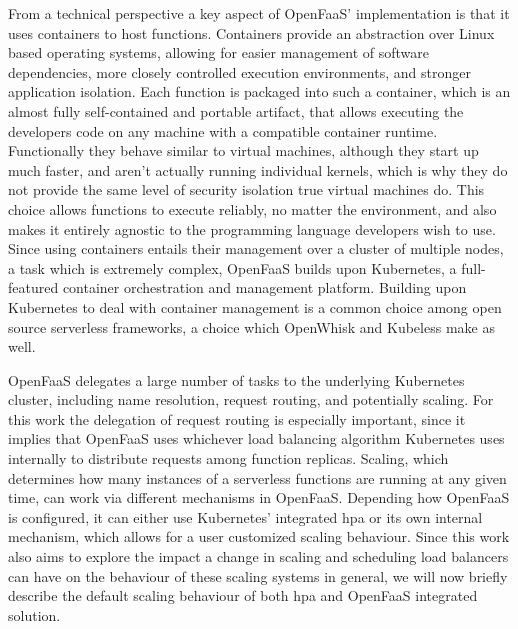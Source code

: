 From a technical perspective a key aspect of OpenFaaS' implementation is that it uses containers to host functions.
Containers provide an abstraction over Linux based operating systems, allowing for easier management of software dependencies, more closely controlled execution environments, and stronger application isolation.
Each function is packaged into such a container, which is an almost fully self-contained and portable artifact, that allows executing the developers code on any machine with a compatible container runtime.
Functionally they behave similar to virtual machines, although they start up much faster, and aren't actually running individual kernels, which is why they do not provide the same level of security isolation true virtual machines do.
This choice allows functions to execute reliably, no matter the environment, and also makes it entirely agnostic to the programming language developers wish to use.
Since using containers entails their management over a cluster of multiple nodes, a task which is extremely complex, OpenFaaS builds upon Kubernetes\cite{kubernetes}, a full-featured container orchestration and management platform.
Building upon Kubernetes to deal with container management is a common choice among open source serverless frameworks, a choice which OpenWhisk and Kubeless make as well\cite{mohantyEvaluationOpenSource2018}.

OpenFaaS delegates a large number of tasks to the underlying Kubernetes cluster, including name resolution, request routing, and potentially scaling.
For this work the delegation of request routing is especially important, since it implies that OpenFaaS uses whichever load balancing algorithm Kubernetes uses internally to distribute requests among function replicas.
Scaling, which determines how many instances of a serverless functions are running at any given time, can work via different mechanisms in OpenFaaS.
Depending how OpenFaaS is configured, it can either use Kubernetes' integrated \gls{hpa}\cite{kubernetes-hpa} or its own internal mechanism, which allows for a user customized scaling behaviour\cite{openfaas-autoscaling}.
Since this work also aims to explore the impact a change in scaling and scheduling load balancers can have on the behaviour of these scaling systems in general, we will now briefly describe the default scaling behaviour of both \gls{hpa} and OpenFaaS integrated solution.

